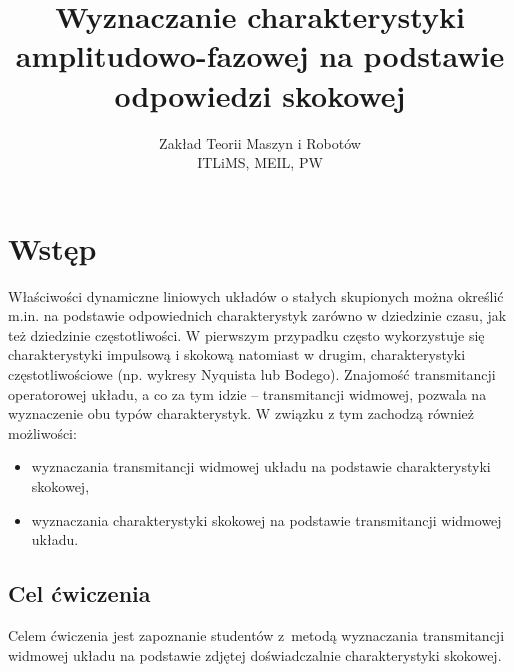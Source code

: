 \documentclass[paper=a4,DIV=12]{lpas}
\begin{document}
\subject{Laboratorium pomiarów, automatyki i~sterowania~I}
\title{Wyznaczanie charakterystyki amplitudowo-fazowej na podstawie odpowiedzi skokowej}

\author{Zakład Teorii Maszyn i Robotów\\ ITLiMS, MEIL, PW}

\date{}
\maketitle

\pagebreak
\tableofcontents
\pagebreak


\section{Wstęp}
\label{sec:LBU9I}

Właściwości dynamiczne liniowych układów o stałych skupionych można określić
m.in. na podstawie odpowiednich charakterystyk zarówno w dziedzinie czasu, jak
też dziedzinie częstotliwości. W pierwszym przypadku często wykorzystuje się
charakterystyki impulsową i skokową natomiast w drugim, charakterystyki
częstotliwościowe (np. wykresy Nyquista lub Bodego). Znajomość transmitancji
operatorowej układu, a co za tym idzie -- transmitancji widmowej, pozwala na
wyznaczenie obu typów charakterystyk. W związku z tym zachodzą również
możliwości:
\begin{itemize}
  \item wyznaczania transmitancji widmowej układu na podstawie charakterystyki
    skokowej,
  \item wyznaczania charakterystyki skokowej na podstawie transmitancji
    widmowej układu.
\end{itemize}


\subsection{Cel ćwiczenia}
\label{sec:ZWO2V}

Celem ćwiczenia jest zapoznanie studentów z~metodą wyznaczania transmitancji
widmowej układu na podstawie zdjętej doświadczalnie charakterystyki skokowej.
\end{document}
